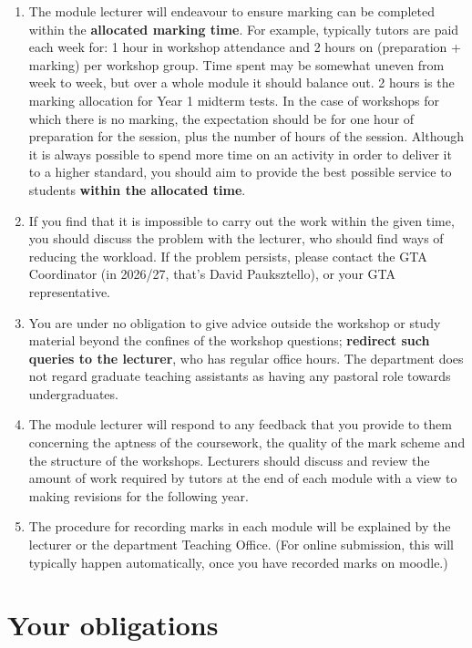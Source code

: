 \documentclass[11pt,a4paper]{amsart}
\begin{document}
\begin{enumerate}
\item The module lecturer will endeavour to ensure marking can be completed within the {\bf allocated marking time}. For example, typically tutors are paid each week for: 1 hour in workshop attendance and 2 hours on (preparation + marking) per workshop group. Time spent may be somewhat uneven from week to week, but over a whole module it should balance out. 2 hours is the marking allocation for Year 1 midterm tests. In the case of workshops for which there is no marking, the expectation should be for one hour of preparation for the session, plus the number of hours of the session. Although it is always possible to spend more time on an activity in order to deliver it to a higher standard, you should aim to provide the best possible service to students {\bf within the allocated time}. 
\item If you find that it is impossible to carry out the work within the given time, you should discuss the problem with the lecturer, who should find ways of reducing the workload. If the problem persists, please contact the GTA Coordinator (in 2026/27, that's David Pauksztello), or your GTA representative.
\item You are under no obligation to give advice outside the workshop or study material beyond the confines of the workshop questions; {\bf redirect such queries to the lecturer}, who has regular office hours. The department does not regard graduate teaching assistants as having any pastoral role towards undergraduates.
\item The module lecturer will respond to any feedback that you provide to them concerning the aptness of the coursework, the quality of the mark scheme and the structure of the workshops. Lecturers should discuss and review the amount of work required by tutors at the end of each module with a view to making revisions for the following year.
\item The procedure for recording marks in each module will be explained by the lecturer or the department Teaching Office. (For online submission, this will typically happen automatically, once you have recorded marks on moodle.)
\end{enumerate}

\section{Your obligations}
\end{document}

